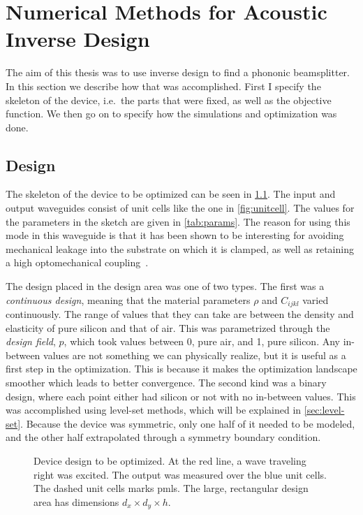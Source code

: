 \chapter{Numerical Methods for Acoustic Inverse Design}\label{sec:methods}

The aim of this thesis was to use inverse design to find a phononic
beamsplitter. In this section we describe how that was accomplished. First I
specify the skeleton of the device, i.e.\ the parts that were fixed, as well as
the objective function. We then go on to specify how the simulations and
optimization was done.

\section{Design}

The skeleton of the device to be optimized can be seen in \cref{fig:bs-design}.
The input and output waveguides consist of unit cells like the one in
\cref{fig:unitcell}.
The values for the parameters in the sketch are given in \cref{tab:params}.
The reason for using this mode in this waveguide is that it has been shown to be
interesting for avoiding mechanical leakage into the substrate on which it is
clamped, as well as retaining a high optomechanical
coupling~\cite{kolvik_clamped_2023}.

The design placed in the design area was one of two types.
The first was a \emph{continuous design}, meaning that the material parameters
$\rho$ and $C_{ijkl}$ varied continuously. The range of values that they
can take are between the density and elasticity of pure silicon and that of air.
This was parametrized through the \emph{design field}, $p$, which took values
between 0, pure air, and 1, pure silicon.
Any in-between values are not something we can physically realize, but it is
useful as a first step in the optimization. This is because it makes the
optimization landscape smoother which leads to better convergence.
The second kind was a binary design, where each point either had silicon or not
with no in-between values.
This was accomplished using level-set methods, which will be explained in
\cref{sec:level-set}.
Because the device was symmetric, only one half of it needed to be
modeled, and the other half extrapolated through a symmetry boundary condition.

\begin{figure}[htpb]
	\centering
	
	\caption{
		Device design to be optimized.
		At the red line, a wave traveling right was excited.
		The output was measured over the blue unit cells.
		The dashed unit cells marks \glspl{pml}.
		The large, rectangular design area has dimensions $d_x \times d_y \times
		h$.
	}
	\label{fig:bs-design}
\end{figure}


